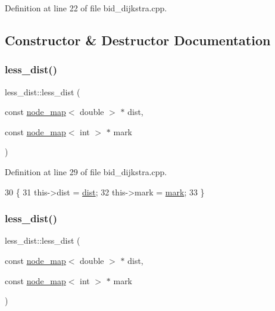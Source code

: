 Definition at line 22 of file bid\+\_\+dijkstra.\+cpp.



\subsection{Constructor \& Destructor Documentation}
\mbox{\label{classless__dist_a103396a9986a15a532b2e5eea09d5ac8}} 
\subsubsection{\texorpdfstring{less\+\_\+dist()}{less\_dist()}\hspace{0.1cm}{\footnotesize\ttfamily [1/2]}}
{\footnotesize\ttfamily less\+\_\+dist\+::less\+\_\+dist (\begin{DoxyParamCaption}\item[{const \mbox{\hyperlink{classnode__map}{node\+\_\+map}}$<$ double $>$ $\ast$}]{dist,  }\item[{const \mbox{\hyperlink{classnode__map}{node\+\_\+map}}$<$ int $>$ $\ast$}]{mark }\end{DoxyParamCaption})\hspace{0.3cm}{\ttfamily [inline]}}



Definition at line 29 of file bid\+\_\+dijkstra.\+cpp.


\begin{DoxyCode}
30     \{
31     this->dist = \mbox{\hyperlink{classless__dist_a5e27ffa3cd5b99bcf5c205fc021ddbb8}{dist}};
32     this->mark = \mbox{\hyperlink{classless__dist_a7905c2d559b1b629175fc810c643375c}{mark}};
33     \}
\end{DoxyCode}
\mbox{\label{classless__dist_a103396a9986a15a532b2e5eea09d5ac8}} 
\subsubsection{\texorpdfstring{less\+\_\+dist()}{less\_dist()}\hspace{0.1cm}{\footnotesize\ttfamily [2/2]}}
{\footnotesize\ttfamily less\+\_\+dist\+::less\+\_\+dist (\begin{DoxyParamCaption}\item[{const \mbox{\hyperlink{classnode__map}{node\+\_\+map}}$<$ double $>$ $\ast$}]{dist,  }\item[{const \mbox{\hyperlink{classnode__map}{node\+\_\+map}}$<$ int $>$ $\ast$}]{mark }\end{DoxyParamCaption})\hspace{0.3cm}{\ttfamily [inline]}}



